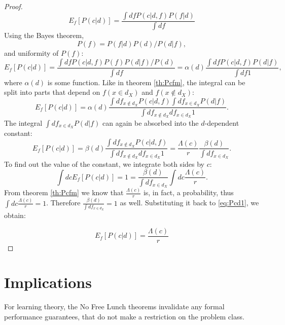\documentclass[a4paper]{article}
\begin{document}
\begin{proof}
  \begin{equation}
    E_f\left[P(c|d)\right] = \frac{\int df P(c|d,f) P(f|d)}{\int df}
  \end{equation}
  Using the Bayes theorem,
  \begin{equation}
    P(f) =  P(f|d) P(d) / P(d|f),
  \end{equation}
  and uniformity of $P(f)$:
  \begin{equation}
    E_f\left[P(c|d)\right] = \frac{\int df P(c|d,f) P(f) P(d|f) / P(d)}{\int df} = \alpha(d)
      \frac{\int df P(c|d,f) P(d|f)}{\int df 1},
  \end{equation}
  where $\alpha(d)$ is some function. Like in theorem \ref{th:Pcfm},
  the integral can be split into parts that depend on
  $f\left(x\in d_X\right)$ and $f\left(x\notin d_X\right)$:
  \begin{equation}
    E_f\left[P(c|d)\right] = \alpha(d) \frac{\int df_{x\notin d_X} P\left(c|d,f \right)
      \int df_{x \in d_X} P\left(d|f\right)}{\int df_{x\notin d_X} df_{x \in d_X} 1}.
  \end{equation}
  The integral $\int df_{x \in d_X} P\left(d|f\right)$ can again be
  absorbed into the $d$-dependent constant:
  \begin{equation}
    E_f\left[P(c|d)\right] = \beta(d) \frac{\int df_{x\notin d_X} P\left(c|d,f \right)
    }{\int df_{x\notin d_X} df_{x \in d_X} 1} = \frac{\Lambda(c)}{r} \frac{\beta(d)}{\int df_{x \in d_X}}.
    \label{eq:Pcd1}
  \end{equation}
  To find out the value of the constant, we integrate both sides by $c$:
  \begin{equation}
    \int dc E_f\left[P(c|d)\right] = 1 = \frac{\beta(d)}{\int df_{x \in d_X}}
    \int dc \frac{\Lambda(c)}{r}.
  \end{equation}
  From theorem \ref{th:Pcfm} we know that $\frac{\Lambda(c)}{r}$ is,
  in fact, a probability, thus $\int dc \frac{\Lambda(c)}{r} =
  1$. Therefore $\frac{\beta(d)}{\int df_{x \in d_X}} = 1$ as
  well. Substituting it back to \ref{eq:Pcd1}, we obtain:
  
  \begin{equation}
    E_f\left[P(c|d)\right] =  \frac{\Lambda(c)}{r}
  \end{equation}
\end{proof}

\section{Implications}
For learning theory, the No Free Lunch theorems invalidate any formal
performance guarantees, that do not make a restriction on the problem
class.
\end{document}
